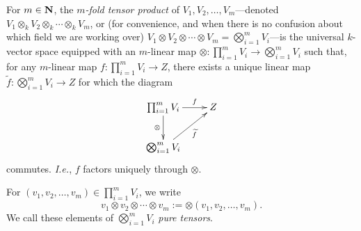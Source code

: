 \begin{dfn}
  For $m \in \boldsymbol{\mathbf{N}}$, the \textit{$m$-fold tensor product} of
  $V_1,V_2,\ldots,V_m$---denoted $V_1 \otimes_k V_2 \otimes_k \cdots
  \otimes_k V_m$, or (for convenience, and when there is no confusion
  about which field we are working over) $V_1 \otimes V_2 \otimes
  \cdots \otimes V_m = \bigotimes_{i=1}^m V_i$---is the universal
  $k$-vector space equipped with an $m$-linear map $\otimes:
  \prod_{i=1}^m V_i \to \bigotimes_{i=1}^m V_i$ such that, for any
  $m$-linear map $f: \prod_{i=1}^m V_i \to Z$, there exists a unique
  linear map $\tilde f: \bigotimes_{i=1}^m V_i \to Z$ for which the
  diagram
  \[
  \xymatrix{ \prod_{i=1}^m V_i \ar[r]^-f \ar[d]_-{\otimes} & Z \\
    \bigotimes_{i=1}^m V_i \ar[ur]_-{\tilde f} }
  \]
  commutes. \emph{I.e.}, $f$ factors uniquely through $\otimes$.
\end{dfn}

\begin{ntn}
  For $(v_1, v_2, \ldots, v_m) \in \prod_{i=1}^m V_i$, we write
  \[ v_1 \otimes v_2 \otimes \cdots \otimes v_m :=
  \otimes(v_1,v_2,\ldots,v_m).
  \]
  We call these elements of $\bigotimes_{i=1}^m V_i$ \textit{pure
    tensors}.
\end{ntn}

